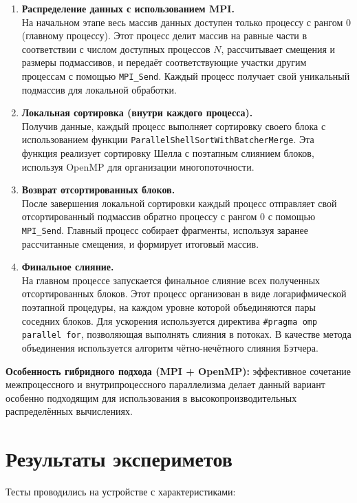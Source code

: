 \documentclass[a4paper,12pt]{article}
\begin{document}
\begin{enumerate}
    \item \textbf{Распределение данных с использованием MPI.} \\
    На начальном этапе весь массив данных доступен только процессу с рангом 0 (главному процессу). Этот процесс делит массив на равные части в соответствии с числом доступных процессов $N$, рассчитывает смещения и размеры подмассивов, и передаёт соответствующие участки другим процессам с помощью \texttt{MPI\_Send}. Каждый процесс получает свой уникальный подмассив для локальной обработки.

    \item \textbf{Локальная сортировка (внутри каждого процесса).} \\
    Получив данные, каждый процесс выполняет сортировку своего блока с использованием функции \texttt{ParallelShellSortWithBatcherMerge}. Эта функция реализует сортировку Шелла с поэтапным слиянием блоков, используя OpenMP для организации многопоточности.

    \item \textbf{Возврат отсортированных блоков.} \\
    После завершения локальной сортировки каждый процесс отправляет свой отсортированный подмассив обратно процессу с рангом 0 с помощью \texttt{MPI\_Send}. Главный процесс собирает фрагменты, используя заранее рассчитанные смещения, и формирует итоговый массив.

    \item \textbf{Финальное слияние.} \\
    На главном процессе запускается финальное слияние всех полученных отсортированных блоков. Этот процесс организован в виде логарифмической поэтапной процедуры, на каждом уровне которой объединяются пары соседних блоков. Для ускорения используется директива \texttt{\#pragma omp parallel for}, позволяющая выполнять слияния в потоках. В качестве метода объединения используется алгоритм чётно-нечётного слияния Бэтчера.
\end{enumerate}
\textbf{Особенность гибридного подхода (MPI + OpenMP):} эффективное сочетание межпроцессного и внутрипроцессного параллелизма  делает данный вариант особенно подходящим для использования в высокопроизводительных распределённых вычислениях.

\newpage
\section{Результаты экспериметов}
Тесты проводились на устройстве с характеристиками:
\end{document}
